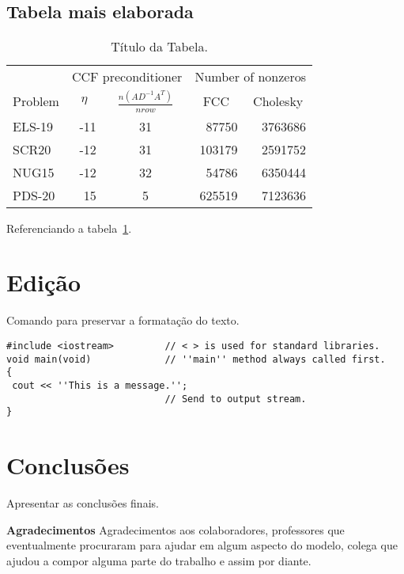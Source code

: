 \documentclass[12pt,fleqn]{article}
\begin{document}
\subsection{Tabela mais elaborada}
\begin{table}[htb]
\begin{center}
\begin{tabular}{|l|r|c|r|r|} \hline
            & \multicolumn{2}{|c|}{{CCF preconditioner}} & \multicolumn{2}{|c|}{{Number of nonzeros}} \\ \cline{2-5}
{Problem}   & \multicolumn{1}{|c|}{$\eta$}  & \multicolumn{1}{|c|}{$ \frac{n(AD^{-1}A^T)}{nrow}$} & \multicolumn{1}{|c|}{FCC} & \multicolumn{1}{|c|}{Cholesky}  \\ \hline \hline
ELS-19    &  -11 & 31 &  87750  & 3763686  \\\hline
SCR20     &  -12 & 31 &  103179 & 2591752  \\\hline
NUG15     &  -12 & 32 &  54786  & 6350444 \\\hline
PDS-20    &   15 & 5  &  625519 & 7123636\\\hline
\end{tabular}
\caption{Título da Tabela.}
\label{tabn}
\end{center}
\end{table}

Referenciando a tabela~\ref{tabn}.

\section{Edição}

Comando para preservar a formatação do texto.
\begin{verbatim}
#include <iostream>         // < > is used for standard libraries.
void main(void)             // ''main'' method always called first.
{
 cout << ''This is a message.'';
                            // Send to output stream.
}
\end{verbatim}




\section{Conclusões}
Apresentar as conclusões finais.

\vspace{5mm}
{\bf{Agradecimentos}} Agradecimentos aos colaboradores, professores que eventualmente procuraram para ajudar em
algum aspecto do modelo, colega que ajudou a compor alguma parte do trabalho e assim por diante.



\end{document}
